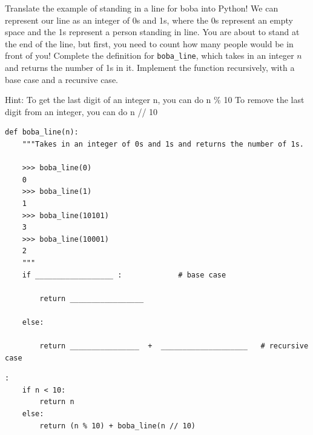 \begin{blocksection}
\question Translate the example of standing in a line for boba into Python! We can represent our line as an integer of 0s and 1s, where the 0s represent an empty space and the 1s represent a person standing in line.
You are about to stand at the end of the line, but first, you need to count how many people would be in front of you!
Complete the definition for \texttt{boba\_line}, which takes in an integer $n$ and returns the number of 1s in it. Implement the function recursively, with a base case and a recursive case.

Hint: To get the last digit of an integer n, you can do n \% 10 
      To remove the last digit from an integer, you can do n // 10 

\begin{lstlisting}
def boba_line(n):
    """Takes in an integer of 0s and 1s and returns the number of 1s.

    >>> boba_line(0)
    0
    >>> boba_line(1)
    1
    >>> boba_line(10101)
    3
    >>> boba_line(10001)
    2
    """
    if __________________ :             # base case

        return _________________

    else:

        return ________________  +  ____________________   # recursive case

\end{lstlisting}

\begin{solution}[1in]
\begin{lstlisting}:
    if n < 10:
        return n
    else:
        return (n % 10) + boba_line(n // 10)
\end{lstlisting}
\end{solution}
\end{blocksection}
